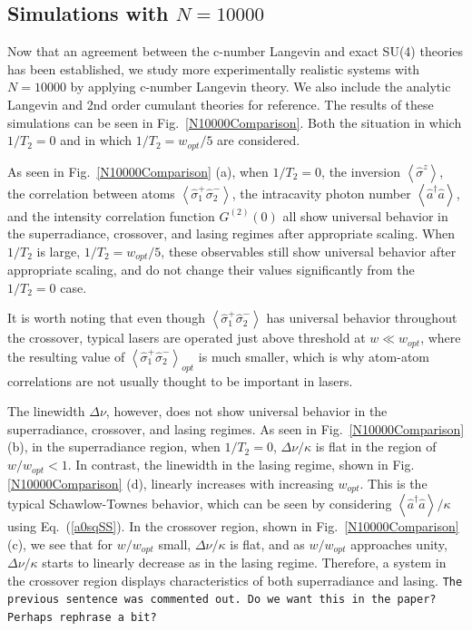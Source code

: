 \documentclass[aps,prl,twocolumn,
superscriptaddress,groupedaddress]{revtex4}
\newcommand{\dmcomment}[1]{{\tt #1}}
\begin{document}
\subsection{Simulations with $N=10000$}

Now that an agreement between the c-number Langevin and exact SU(4)
theories has been established, we study more experimentally realistic
systems with $N=10000$ by applying c-number Langevin theory. We also
include the analytic Langevin and 2nd order cumulant theories for
reference. The results of these simulations can be seen in
Fig.~\ref{N10000Comparison}. Both the situation in which $1/T_2=0$ and
in which $1/T_2=w_{opt}/5$ are considered.

As seen in Fig.~\ref{N10000Comparison} (a), when $1/T_2=0$, the
inversion $\left<\hat{\sigma}^{z}\right>$, the correlation between atoms
$\left<\hat{\sigma}_{1}^{+} \hat{\sigma}_{2}^{-}\right>$, the
intracavity photon number  $\left<\hat{a}^{\dagger}\hat{a}\right>$,  and
the intensity correlation function $G^{(2)}(0)$ all show universal
behavior in the superradiance, crossover, and lasing regimes after
appropriate scaling. When $1/T_2$ is large, $1/T_2=w_{opt}/5$, these
observables still show universal behavior after appropriate scaling, and
do not change their values significantly from the $1/T_2=0$ case.

It is worth noting that even though  $\left<\hat{\sigma}_{1}^{+}
\hat{\sigma}_{2}^{-}\right>$ has universal behavior throughout the
crossover, typical lasers are operated just above threshold at $w \ll
w_{opt}$, where the resulting value of
$\left<\hat{\sigma}_{1}^{+}\hat{\sigma}_{2}^{-}\right>_{opt}$ is much
smaller, which is why atom-atom correlations are not usually thought to
be important in lasers.

The linewidth $\Delta \nu$, however, does not show universal behavior in
the superradiance, crossover, and lasing regimes. As seen in
Fig.~\ref{N10000Comparison} (b), in the superradiance region, when
$1/T_2=0$, $\Delta \nu / \kappa$ is flat in the region of $w/w_{opt}<1$.
In contrast, the linewidth in the lasing regime, shown in
Fig.\ref{N10000Comparison} (d), linearly increases with increasing
$w_{opt}$. This is the typical Schawlow-Townes behavior, which can be
seen by considering $\left<\hat{a}^{\dagger}\hat{a}\right>/\kappa$ using
Eq.~(\ref{a0sqSS}). In the crossover region, shown in
Fig.~\ref{N10000Comparison} (c), we see that for $w/w_{opt}$ small,
$\Delta \nu/\kappa$ is flat, and as $w/w_{opt}$ approaches unity,
$\Delta \nu/\kappa$ starts to linearly decrease as in the lasing regime.
Therefore, a system in the crossover region displays characteristics of
both superradiance and lasing.
\dmcomment{The previous sentence was commented out. Do we want this in
  the paper? Perhaps rephrase a bit?}
\end{document}
